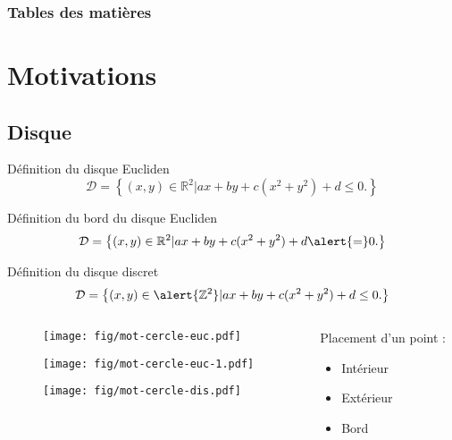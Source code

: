 \documentclass{beamer}
\begin{document}
\begin{frame}
  \frametitle{Tables des matières} %
  \setcounter{tocdepth}{1}
  \tableofcontents %
\end{frame}

\section{Motivations}

\subsection{Disque}
\begin{frame}
  {
    \begin{block}{Définition du disque Eucliden}
      $$\mathcal{D} =  \left\{ (x,y) \in \mathbb{R}^{2} |  ax + by + c(x^2 + y^2) + d \leq 0. \right\}$$
    \end{block}
  }
  {
    \begin{block}{Définition du bord du disque Eucliden}
      $$\mathcal{D} =  \left\{ (x,y) \in \mathbb{R}^{2} |  ax + by + c(x^2 + y^2) + d \alert{=} 0. \right\}$$
    \end{block}
  }  
  {
    \begin{block}{Définition du disque discret}
      $$\mathcal{D} =  \left\{ (x,y) \in \alert{\mathbb{Z}^{2}} |  ax + by + c(x^2 + y^2) + d \leq 0. \right\}$$
    \end{block}
  }
  \begin{columns}[t]
    \begin{column}{6cm}
      {
        \begin{figure}[h!]
          \centering
          \texttt{[image: fig/mot-cercle-euc.pdf]}
        \end{figure}
      }
      {
        \begin{figure}[h!]
          \centering
          \texttt{[image: fig/mot-cercle-euc-1.pdf]}
        \end{figure}
      }
      {
        \begin{figure}[h!]
          \centering
          \texttt{[image: fig/mot-cercle-dis.pdf]}
        \end{figure}
      }
      \end{column}
      \begin{column}{5cm}
        \vspace{-0.4cm}
        \begin{exampleblock}{Placement d'un point :}
          \begin{itemize}
            \item Intérieur
            \item Extérieur
            \item Bord
          \end{itemize}
        \end{exampleblock}


\end{column}
\end{columns}
\end{frame}
\end{document}
